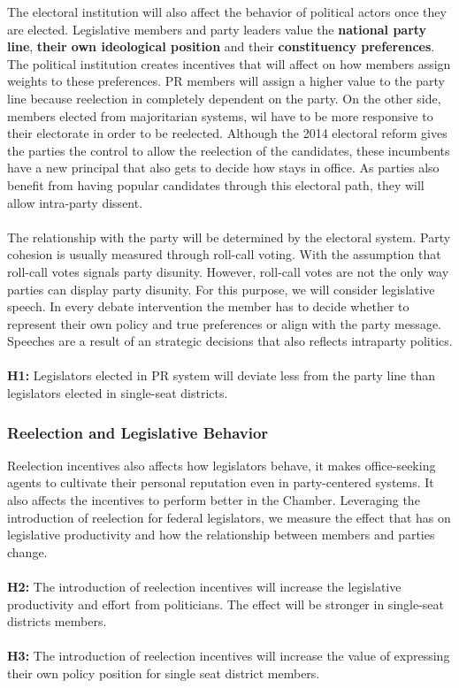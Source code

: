 \documentclass{article}
\begin{document}
The electoral institution will also affect the behavior of political actors once they are elected. Legislative members and party leaders value the \textbf{national party line}, \textbf{their own ideological position} and their \textbf{constituency preferences}. The political institution creates incentives that will affect on how members assign weights to these preferences. PR members will assign a higher value to the party line because reelection in completely dependent on the party. On the other side, members elected from majoritarian systems, wil have to be more responsive to their electorate in order to be reelected. Although the 2014 electoral reform gives the parties the control to allow the reelection of the candidates, these incumbents have a new principal that also gets to decide how stays in office. As parties also benefit from having popular candidates through this electoral path, they will allow intra-party dissent. \\
\\
The relationship with the party will be determined by the electoral system. Party cohesion is usually measured through roll-call voting. With the assumption that roll-call votes signals party disunity. However, roll-call votes are not the only way parties can display party disunity. For this purpose, we will consider legislative speech. In every debate intervention the member has to decide whether to represent their own policy and true preferences or align with the party message. Speeches are a result of an strategic decisions that also reflects intraparty politics. \\
\\ 
\textbf{H1:} Legislators elected in PR system will deviate less from the party line than legislators elected in single-seat districts.  


\subsubsection*{Reelection and Legislative Behavior}

Reelection incentives also affects how legislators behave, it makes office-seeking agents to cultivate their personal reputation even in party-centered systems. It also affects the incentives to perform better in the Chamber. Leveraging the introduction of reelection for federal legislators, we measure the effect that has on legislative productivity and how the relationship between members and parties change. \\
\\ 
\textbf{H2:} The introduction of reelection incentives will increase the legislative productivity and effort from politicians. The effect will be stronger in single-seat districts members. \\
\\ 
\textbf{H3:} The introduction of reelection incentives will increase the value of expressing their own policy position for single seat district members. 
\end{document}
